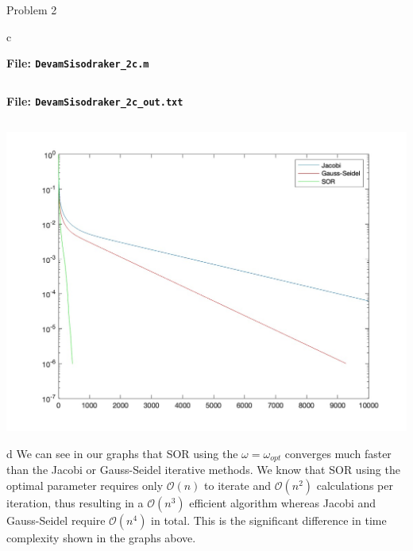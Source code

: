 \begin{section}{Problem 2}
    \newpage
    
    \begin{solution}{c}
        \begin{mdframed}
            \scriptsize
            \textbf{File: {\tt DevamSisodraker\_2c.m}}
            \inputminted{matlab}{DevamSisodraker_2c.m}
            \normalfont
        \end{mdframed}

        \continued

        \begin{mdframed}
            \footnotesize
            \textbf{File: {\tt DevamSisodraker\_2c\_out.txt}}
            \inputminted{matlab}{DevamSisodraker_2c_out.txt}
            \normalfont
        \end{mdframed}

        \continued

        \begin{mdframed}[]
            \includegraphics[scale=0.33]{DevamSisodraker_2c.jpg}
        \end{mdframed}
    \end{solution}

    \newpage
    
    \begin{solution}{d}
        We can see in our graphs that SOR using the $\omega = \omega_{opt}$ converges much faster than the Jacobi or Gauss-Seidel iterative methods. We know that SOR using the optimal parameter requires only $\mathcal{O}(n)$ to iterate and $\mathcal{O}(n^2)$ calculations per iteration, thus resulting in a $\mathcal{O}(n^3)$ efficient algorithm whereas Jacobi and Gauss-Seidel require $\mathcal{O}(n^4)$ in total. This is the significant difference in time complexity shown in the graphs above.
    \end{solution}

\end{section}